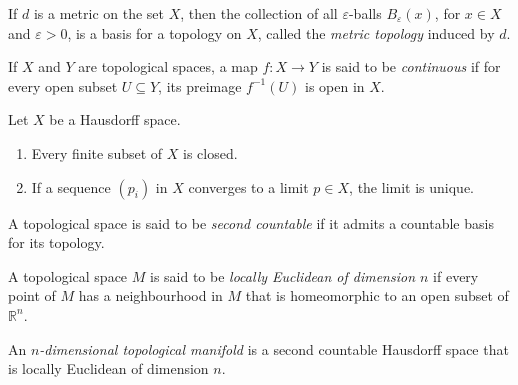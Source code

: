 \vspace{1mm}

\begin{definition}
	If $d$ is a metric on the set $X$, then the collection of all $\varepsilon$-balls $B_\varepsilon(x)$, for $x \in X$ and $\varepsilon > 0$, is a basis for a topology on $X$, called the \emph{metric topology} induced by $d$.
\end{definition}

\vspace{1mm}

\begin{definition}
	If $X$ and $Y$ are topological spaces, a map $f: X \to Y$ is said to be \emph{continuous} if for every open subset $U \subseteq Y$, its preimage $f^{-1}(U)$ is open in $X$.
\end{definition}

\vspace{1mm}

\begin{proposition}
	Let $X$ be a Hausdorff space.

	\begin{enumerate}[label = (\alph*)]
		\item Every finite subset of $X$ is closed.
		\item If a sequence $(p_i)$ in $X$ converges to a limit $p \in X$, the limit is unique.
	\end{enumerate}
\end{proposition}

\vspace{1mm}

\begin{definition}
	A topological space is said to be \emph{second countable} if it admits a countable basis for its topology.
\end{definition}

\vspace{1mm}

\begin{definition}
	A topological space $M$ is said to be \emph{locally Euclidean of dimension $n$} if every point of $M$ has a neighbourhood in $M$ that is homeomorphic to an open subset of $\mathbb{R}^n$.
\end{definition}

\vspace{1mm}

\begin{definition}
	An \emph{$n$-dimensional topological manifold} is a second countable Hausdorff space that is locally Euclidean of dimension $n$.
\end{definition}

